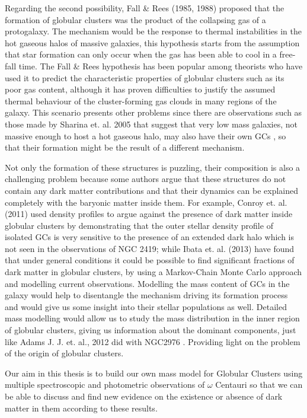 Regarding the second possibility, Fall \& Rees (1985, 1988)\cite{13} proposed that the formation of globular clusters was the product of the collapsing gas of a protogalaxy. The mechanism would be the response to thermal instabilities in the hot gaseous halos of massive galaxies, this hypothesis starts from the assumption that star formation can only occur when the gas has been able to cool in a free-fall time. The Fall \& Rees hypothesis has been popular among theorists who have used it to predict the characteristic properties of globular clusters such as its poor gas content, although it has proven difficulties to justify the assumed thermal behaviour of the cluster-forming gas clouds in many regions of the galaxy. This scenario presents other problems since there are observations such as those made by Sharina et. al. 2005 \cite{10} that suggest that very low mass galaxies, not massive enough to host a hot gaseous halo, may also have their own GCs , so that their formation might be the result of a different mechanism.

Not only the formation of these structures is puzzling, their composition is also a challenging problem because some authors argue that these structures do not contain any dark matter contributions and that their dynamics can be explained completely with the baryonic matter inside them. For example, Conroy et. al. (2011) \cite{14} used density profiles to argue against the presence of dark matter inside globular clusters by demonstrating that the outer stellar density profile of isolated GCs is
very sensitive to the presence of an extended dark halo which is not seen in the observations of NGC 2419; while Ibata et. al. (2013) \cite{5} have found that under general conditions it could be possible to find significant fractions of dark matter in globular clusters, by using a Markov-Chain Monte Carlo approach and modelling current observations. Modelling the mass content of GCs in the galaxy would help to disentangle the mechanism driving its formation process and would give us some insight into their stellar populations as well. Detailed mass modelling would allow us to study the mass distribution in the inner region of globular clusters, giving us information about the dominant components, just like Adams J. J. et. al., 2012 did with NGC2976 \cite{6}. Providing light on the problem of the origin of globular clusters.

Our aim in this thesis is to build our own mass model for Globular Clusters using multiple spectroscopic and photometric observations of $\omega$ Centauri so that we can be able to discuss and find new evidence on the existence or absence of dark matter in them according to these results. 

